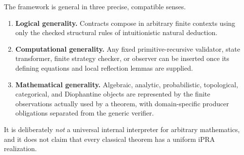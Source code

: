 The framework is general in three precise, compatible senses.

\begin{enumerate}[label=(G\arabic*)]
\item \textbf{Logical generality.}  Contracts compose in arbitrary finite
contexts using only the checked structural rules of intuitionistic natural
deduction.
\item \textbf{Computational generality.}  Any fixed primitive-recursive
validator, state transformer, finite strategy checker, or observer can be
inserted once its defining equations and local reflection lemmas are supplied.
\item \textbf{Mathematical generality.}  Algebraic, analytic, probabilistic,
topological, categorical, and Diophantine objects are represented by the
finite observations actually used by a theorem, with domain-specific producer
obligations separated from the generic verifier.
\end{enumerate}

It is deliberately \emph{not} a universal internal interpreter for arbitrary
mathematics, and it does not claim that every classical theorem has a uniform
iPRA realization.
